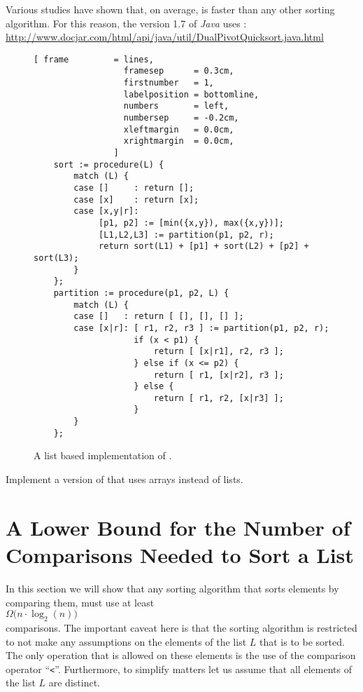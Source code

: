 \begin{enumerate}
      Various studies have shown that, on average,  is faster than any other sorting
      algorithm.  For this reason, the version 1.7 of \textsl{Java} uses :
      \\[0.2cm]
      \hspace*{0.3cm}
      \href{http://www.docjar.com/html/api/java/util/DualPivotQuicksort.java.html}{http://www.docjar.com/html/api/java/util/DualPivotQuicksort.java.html} 
\end{enumerate}

\begin{figure}[!ht]
\centering
\begin{Verbatim}[ frame         = lines, 
                  framesep      = 0.3cm, 
                  firstnumber   = 1,
                  labelposition = bottomline,
                  numbers       = left,
                  numbersep     = -0.2cm,
                  xleftmargin   = 0.0cm,
                  xrightmargin  = 0.0cm,
                ]
    sort := procedure(L) {
        match (L) {
        case []     : return [];
        case [x]    : return [x];
        case [x,y|r]: 
             [p1, p2] := [min({x,y}), max({x,y})];
             [L1,L2,L3] := partition(p1, p2, r);
             return sort(L1) + [p1] + sort(L2) + [p2] + sort(L3);
        }
    };
    partition := procedure(p1, p2, L) {
        match (L) {
        case []   : return [ [], [], [] ];
        case [x|r]: [ r1, r2, r3 ] := partition(p1, p2, r);
                    if (x < p1) {
                        return [ [x|r1], r2, r3 ];
                    } else if (x <= p2) {
                        return [ r1, [x|r2], r3 ];
                    } else {
                        return [ r1, r2, [x|r3] ];
                    }
        }
    };
\end{Verbatim}
\vspace*{-0.3cm}
\caption{A list based implementation of .}
\label{fig:dual-pivot-quick-sort.stlx}
\end{figure}

\exercise
Implement a version of  that uses arrays instead of lists.


\section[A Lower Bound]{A Lower Bound for the Number of Comparisons Needed to Sort a List}
In this section we will show that any sorting algorithm that sorts elements by comparing them, must
use at least 
\\[0.2cm]
\hspace*{1.3cm}
 $\Omega\bigl(n \cdot \log_2(n)\bigr)$ 
\\[0.2cm]
comparisons.  The important caveat here is that the sorting algorithm is restricted to not make any assumptions
on the elements of the list $L$ that is to be sorted.  The only operation that is allowed on these
elements is the use of the comparison operator ``\texttt{<}''.  Furthermore, to simplify matters let
us assume that all elements of the list $L$ are distinct.


